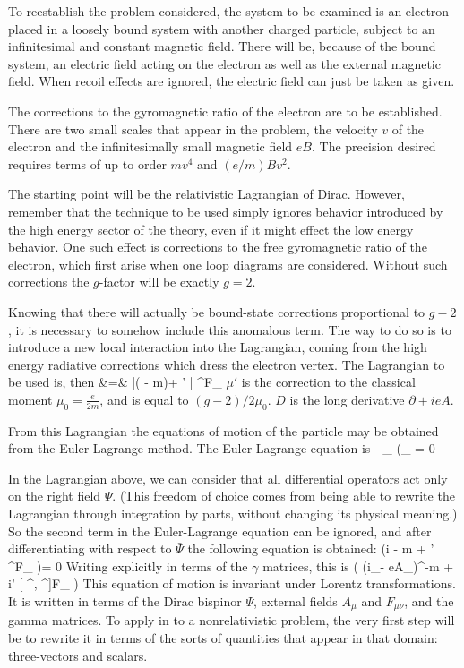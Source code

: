 To reestablish the problem considered, the system to be examined is an electron placed in a loosely bound system with another charged particle, subject to an infinitesimal and constant magnetic field.  There will be, because of the bound system, an electric field acting on the electron as well as the external magnetic field.  When recoil effects are ignored, the electric field can just be taken as given.

The corrections to the gyromagnetic ratio of the electron are to be established.  There are two small scales that appear in the problem, the velocity $v$ of the electron and the infinitesimally small magnetic field $eB$.  The precision desired requires terms of up to order $mv^4$ and $ (e/m)Bv^2$.

The starting point will be the relativistic Lagrangian of Dirac.  However, remember that the technique to be used simply ignores behavior introduced by the high energy sector of the theory, even if it might effect the low energy behavior.  One such effect is corrections to the free gyromagnetic ratio of the electron, which first arise when one loop diagrams are considered.  Without such corrections the $g$-factor will be exactly $g=2$.

Knowing that there will actually be bound-state corrections proportional to $g-2$, it is necessary to somehow include this anomalous term.  The way to do so is to introduce a new local interaction into the Lagrangian, coming from the high energy radiative corrections which dress the electron vertex.  The Lagrangian to be used is, then
\beqa
{} &=&	
	\bar{\Psi}( - m)\Psi +  \mu' \bar{\Psi} \sigma^{\mu\nu}F_{\mu\nu} \Psi	
\eeqa
$\mu'$ is the correction to the classical moment $\mu_0 = \frac{e}{2m}$, and is equal to $(g-2)/2 \mu_0$.  $D$ is the long derivative $\partial + ieA$.


From this Lagrangian the equations of motion of the particle may be obtained from the Euler-Lagrange method.  The Euler-Lagrange equation is
\beq
{} - \partial_\mu {} {\partial (\partial_\mu {\bar{\Psi})} } 
	= 0	
\eeq

In the Lagrangian above, we can consider that all differential operators act only on the right field $\Psi$.  (This freedom of choice comes from being able to rewrite the Lagrangian through integration by parts, without changing its physical meaning.)  So the second term in the Euler-Lagrange equation can be ignored, and after differentiating with respect to $\bar{\Psi}$ the following equation is obtained:
\beq
	(i - m +  \mu'  \sigma^{\mu\nu}F_{\mu\nu} )\Psi = 0	
\eeq
Writing explicitly in terms of the $\gamma$ matrices, this is
\beq \label{eq:Sh:eom}
	\left( (i\partial_\mu- eA_\mu)\gamma^\mu -m + i\mu' [ \gamma^\mu, \gamma^\nu]F_{\mu\nu} \right) 
\eeq
This equation of motion is invariant under Lorentz transformations.  It is written in terms of the Dirac bispinor $\Psi$, external fields $A_\mu$ and $F_{\mu\nu}$, and the gamma matrices.  To apply in to a nonrelativistic problem, the very first step will be to rewrite it in terms of the sorts of quantities that appear in that domain: three-vectors and scalars.

